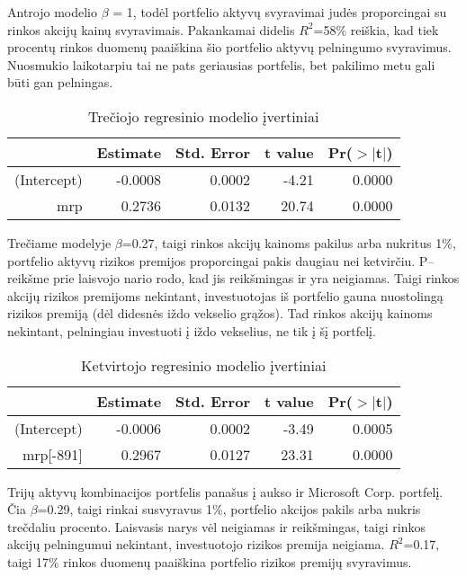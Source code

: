\documentclass[12pt, a14paper, lithuanian]{article}
\begin{document}
Antrojo modelio $\beta$ = 1, todėl portfelio aktyvų svyravimai judės proporcingai su rinkos akcijų kainų svyravimais.
Pakankamai didelis $R^2$=58\% reiškia, kad tiek procentų rinkos duomenų paaiškina šio portfelio aktyvų pelningumo
svyravimus. Nuosmukio laikotarpiu tai ne pats geriausias portfelis, bet pakilimo metu gali būti gan pelningas.


\begin{table}[ht]
\begin{center}
\begin{tabular}{rrrrr}
\hline
& Estimate & Std. Error & t value & Pr($>$$|$t$|$) \\
\hline
(Intercept) & -0.0008 & 0.0002 & -4.21 & 0.0000 \\
mrp & 0.2736 & 0.0132 & 20.74 & 0.0000 \\
\hline
\end{tabular}
\end{center}
\caption{Trečiojo regresinio modelio įvertiniai}
\end{table}

Trečiame modelyje $\beta$=0.27, taigi rinkos akcijų kainoms pakilus arba nukritus 1\%, portfelio aktyvų rizikos premijos
proporcingai pakis daugiau nei ketvirčiu. P--reikšme prie laisvojo nario rodo, kad jis reikšmingas ir yra 
neigiamas. Taigi rinkos akcijų rizikos premijoms nekintant, investuotojas iš portfelio gauna
nuostolingą rizikos premiją (dėl didesnės iždo vekselio grąžos). Tad rinkos akcijų kainoms nekintant,
pelningiau investuoti į iždo vekselius, ne tik į šį portfelį.


\begin{table}[ht]
\begin{center}
\begin{tabular}{rrrrr}
\hline
& Estimate & Std. Error & t value & Pr($>$$|$t$|$) \\
\hline
(Intercept) & -0.0006 & 0.0002 & -3.49 & 0.0005 \\
mrp[-891] & 0.2967 & 0.0127 & 23.31 & 0.0000 \\
\hline
\end{tabular}
\end{center}
\caption{Ketvirtojo regresinio modelio įvertiniai}
\end{table}

Trijų aktyvų kombinacijos portfelis panašus į aukso ir Microsoft Corp. portfelį. Čia $\beta$=0.29, taigi rinkai susvyravus 1\%,
portfelio akcijos pakils arba nukris trečdaliu procento. Laisvasis narys vėl neigiamas ir reikšmingas, taigi
rinkos akcijų pelningumui nekintant, investuotojo rizikos premija neigiama. $R^2$=0.17, taigi 17\% rinkos duomenų
paaiškina portfelio rizikos premijų svyravimus.\\
\end{document}
